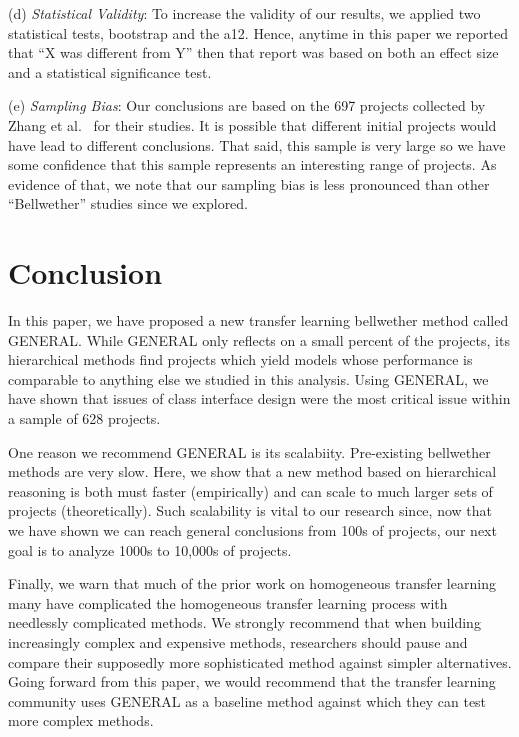 \documentclass[10pt,journal,compsoc]{IEEEtran}
\begin{document}
(d) \textit{Statistical Validity}: To increase the validity of our results, we applied two statistical tests, bootstrap and the a12. Hence, anytime in this paper we reported that ``X was different from Y'' then that report was based on both an effect size and a statistical significance test.
 
(e) \textit{Sampling Bias}: Our conclusions are based on the 697 projects collected by Zhang et al.~\cite{zhang15} for their studies. It is possible that different initial projects would have lead to different conclusions. That said, this sample is very large so we have some confidence that this sample represents an interesting range of projects. As evidence of that, we note that our sampling bias is less pronounced than other ``Bellwether'' studies since we explored.
 



\section{Conclusion}
\label{sec:concl}
In this paper, we have proposed a new transfer learning  bellwether method   called GENERAL.
While GENERAL only reflects on a small percent of the projects,
its hierarchical methods find projects which yield models
whose performance is comparable to anything else we studied
in this analysis.
Using GENERAL, we have shown that issues
of class interface design were the most critical
issue within a sample of 628 projects.

One reason we recommend GENERAL is its scalabiity.
Pre-existing
bellwether methods are very slow. Here, we show
that a new method based on hierarchical reasoning
is both must faster (empirically) and can scale to much
larger sets of projects (theoretically). Such scalability
is vital to our research since, now that we have shown
we can reach general conclusions from 100s of projects,
our next goal is to analyze 1000s to 10,000s of projects.



Finally, we warn that much of the prior work on homogeneous transfer learning many  have complicated the homogeneous transfer learning process with needlessly
complicated methods.
  We strongly recommend that when building increasingly complex and expensive  methods, researchers should pause and compare their supposedly more sophisticated method against simpler alternatives. Going forward from this paper, we would recommend that the transfer learning community uses GENERAL as a baseline method against which they can test more complex methods.
\end{document}
